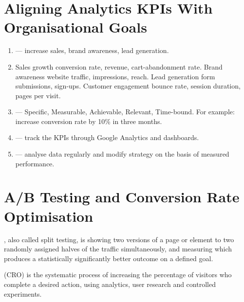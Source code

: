 \documentclass{MMTextbook}
\begin{document}
\section{Aligning Analytics KPIs With Organisational Goals}

\begin{exambox}
\begin{enumerate}
\item {} --- increase sales, brand awareness, lead
      generation.
\item {} Sales growth \ra{} conversion rate,
      revenue, cart-abandonment rate. Brand awareness \ra{} website traffic,
      impressions, reach. Lead generation \ra{} form submissions, sign-ups.
      Customer engagement \ra{} bounce rate, session duration, pages per visit.
\item {} --- Specific, Measurable, Achievable, Relevant,
      Time-bound. For example: increase conversion rate by 10\% in three months.
\item {} --- track the KPIs through Google Analytics and
      dashboards.
\item {} --- analyse data regularly and
      modify strategy on the basis of measured performance.
\end{enumerate}
\end{exambox}

\section{A/B Testing and Conversion Rate Optimisation}

\begin{definitionbox}
, also called split testing, is showing two
versions of a page or element to two randomly assigned halves of the traffic
simultaneously, and measuring which produces a statistically significantly
better outcome on a defined goal.

 (CRO) is
the systematic process of increasing the percentage of visitors who complete a
desired action, using analytics, user research and controlled experiments.
\end{definitionbox}
\end{document}
